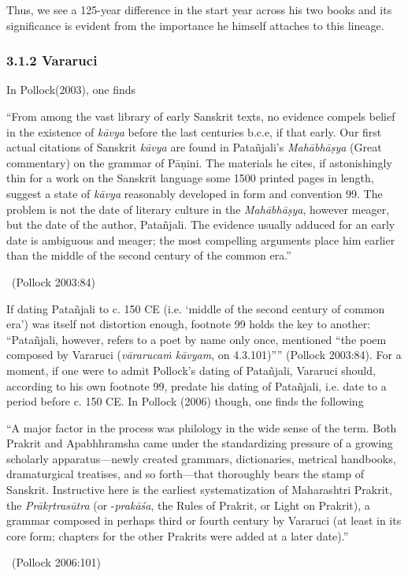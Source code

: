 Thus, we see a 125-year difference in the start year across his two books and its significance is evident from the importance he himself attaches to this lineage.

\subsubsection*{3.1.2 Vararuci}

In Pollock(2003), one finds

\begin{myquote}
“From among the vast library of early Sanskrit texts, no evidence compels belief in the existence of \textit{kāvya} before the last centuries b.c.e, if that early. Our first actual citations of Sanskrit \textit{kāvya} are found in Patañjali’s \textit{Mahābhāṣya} (Great commentary) on the grammar of Pāṇini. The materials he cites, if astonishingly thin for a work on the Sanskrit language some 1500 printed pages in length, suggest a state of \textit{kāvya} reasonably developed in form and convention 99. The problem is not the date of literary culture in the \textit{Mahābhāṣya}, however meager, but the date of the author, Patañjali. The evidence usually adduced for an early date is ambiguous and meager; the most compelling arguments place him earlier than the middle of the second century of the common era.” 

~\hfill (Pollock 2003:84)
\end{myquote}

If dating Patañjali to c. 150 CE (i.e. ‘middle of the second century of common era’) was itself not distortion enough, footnote 99 holds the key to another: “Patañjali, however, refers to a poet by name only once, mentioned “the poem composed by Vararuci (\textit{vārarucaṁ kāvyam}, on 4.3.101)”” (Pollock 2003:84). For a moment, if one were to admit Pollock’s dating of Patañjali, Vararuci should, according to his own footnote 99, predate his dating of Patañjali, i.e. date to a period before c. 150 CE. In Pollock (2006) though, one finds the following

\begin{myquote}
“A major factor in the process was philology in the wide sense of the term. Both Prakrit and Apabhhramsha came under the standardizing pressure of a growing scholarly apparatus—newly created grammars, dictionaries, metrical handbooks, dramaturgical treatises, and so forth—that thoroughly bears the stamp of Sanskrit. Instructive here is the earliest systematization of Maharashtri Prakrit, the \textit{Prākṛtrasūtra} (or -\textit{prakāśa}, the Rules of Prakrit, or Light on Prakrit), a grammar composed in perhaps third or fourth century by Vararuci (at least in its core form; chapters for the other Prakrits were added at a later date).” 

~\hfill (Pollock 2006:101)
\end{myquote}

